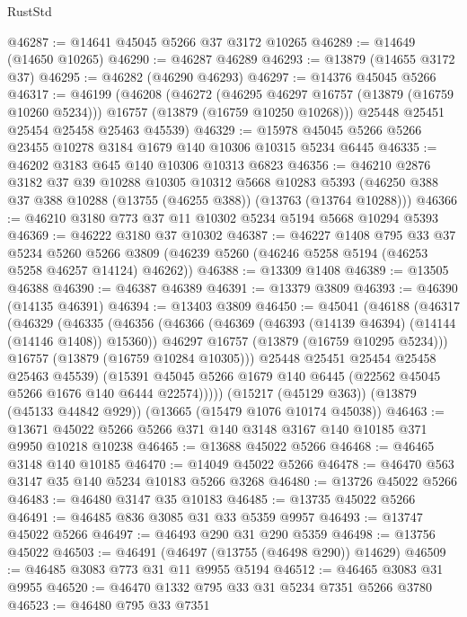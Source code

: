 \begin{lexlean}{RustStd}
\begin{coremodule}
@46287 := @14641 @45045 @5266 @37 @3172 @10265
@46289 := @14649 (@14650 @10265)
@46290 := @46287 @46289
@46293 := @13879 (@14655 @3172 @37)
@46295 := @46282 (@46290 @46293)
@46297 := @14376 @45045 @5266
@46317 := @46199
    (@46208
      (@46272
        (@46295 @46297 @16757 (@13879 (@16759 @10260 @5234)))
        @16757
        (@13879 (@16759 @10250 @10268)))
      @25448
      @25451
      @25454
      @25458
      @25463
      @45539)
@46329 := @15978 @45045 @5266 @5266 @23455 @10278 @3184 @1679 @140 @10306 @10315 @5234 @6445
@46335 := @46202 @3183 @645 @140 @10306 @10313 @6823
@46356 := @46210
    @2876
    @3182
    @37
    @39
    @10288
    @10305
    @10312
    @5668
    @10283
    @5393
    (@46250 @388 @37 @388 @10288 (@13755 (@46255 @388)) (@13763 (@13764 @10288)))
@46366 := @46210 @3180 @773 @37 @11 @10302 @5234 @5194 @5668 @10294 @5393
@46369 := @46222 @3180 @37 @10302
@46387 := @46227
    @1408
    @795
    @33
    @37
    @5234
    @5260
    @5266
    @3809
    (@46239 @5260 (@46246 @5258 @5194 (@46253 @5258 @46257 @14124) @46262))
@46388 := @13309 @1408
@46389 := @13505 @46388
@46390 := @46387 @46389
@46391 := @13379 @3809
@46393 := @46390 (@14135 @46391)
@46394 := @13403 @3809
@46450 := @45041
    (@46188
      (@46317
        (@46329
          (@46335
            (@46356
              (@46366
                (@46369 (@46393 (@14139 @46394) (@14144 (@14146 @1408)) @15360))
                @46297
                @16757
                (@13879 (@16759 @10295 @5234)))
              @16757
              (@13879 (@16759 @10284 @10305)))
            @25448
            @25451
            @25454
            @25458
            @25463
            @45539)
          (@15391 @45045 @5266 @1679 @140 @6445 (@22562 @45045 @5266 @1676 @140 @6444 @22574)))))
    (@15217 (@45129 @363))
    (@13879 (@45133 @44842 @929))
    (@13665 (@15479 @1076 @10174 @45038))
@46463 := @13671 @45022 @5266 @5266 @371 @140 @3148 @3167 @140 @10185 @371 @9950 @10218 @10238
@46465 := @13688 @45022 @5266
@46468 := @46465 @3148 @140 @10185
@46470 := @14049 @45022 @5266
@46478 := @46470 @563 @3147 @35 @140 @5234 @10183 @5266 @3268
@46480 := @13726 @45022 @5266
@46483 := @46480 @3147 @35 @10183
@46485 := @13735 @45022 @5266
@46491 := @46485 @836 @3085 @31 @33 @5359 @9957
@46493 := @13747 @45022 @5266
@46497 := @46493 @290 @31 @290 @5359
@46498 := @13756 @45022
@46503 := @46491 (@46497 (@13755 (@46498 @290)) @14629)
@46509 := @46485 @3083 @773 @31 @11 @9955 @5194
@46512 := @46465 @3083 @31 @9955
@46520 := @46470 @1332 @795 @33 @31 @5234 @7351 @5266 @3780
@46523 := @46480 @795 @33 @7351

\end{coremodule}
\end{lexlean}
